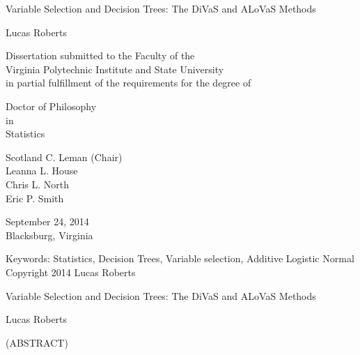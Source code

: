 \documentclass[12pt]{report}
\begin{document}
\thispagestyle{empty}
\begin{center}

{\Large 
Variable Selection and Decision Trees: The DiVaS and ALoVaS Methods
}

\vfill

Lucas Roberts

\vfill

Dissertation submitted to the Faculty of the \\
Virginia Polytechnic Institute and State University \\
in partial fulfillment of the requirements for the degree of

\vfill

Doctor of Philosophy \\
in \\
Statistics

\vfill

Scotland C. Leman (Chair) \\
Leanna L. House \\
Chris L. North \\
Eric P. Smith

\vfill

September 24, 2014 \\
Blacksburg, Virginia

\vfill

Keywords: Statistics, Decision Trees, Variable selection, Additive Logistic Normal
\\
Copyright 2014 Lucas Roberts

\end{center}

\pagebreak

\thispagestyle{empty}
\begin{center}

{\large Variable Selection and Decision Trees: The DiVaS and ALoVaS Methods
}

\vfill

Lucas Roberts

\vfill

(ABSTRACT)

\vfill

\end{center}
\end{document}
